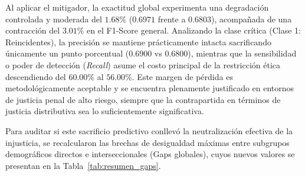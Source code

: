 \documentclass[11pt,a4paper]{article}
\begin{document}
\begin{table}[H]
\centering
\caption{Comparativa de rendimiento predictivo absoluto global y por clase crítica.}
\label{tab:rendimiento_predictivo}
\end{table}

Al aplicar el mitigador, la exactitud global experimenta una degradación controlada y moderada del $1.68\%$ ($0.6971$ frente a $0.6803$), acompañada de una contracción del $3.01\%$ en el F1-Score general. Analizando la clase crítica (Clase 1: Reincidentes), la precisión se mantiene prácticamente intacta sacrificando únicamente un punto porcentual ($0.6900$ vs $0.6800$), mientras que la sensibilidad o poder de detección (\textit{Recall}) asume el costo principal de la restricción ética descendiendo del $60.00\%$ al $56.00\%$. Este margen de pérdida es metodológicamente aceptable y se encuentra plenamente justificado en entornos de justicia penal de alto riesgo, siempre que la contrapartida en términos de justicia distributiva sea lo suficientemente significativa.

Para auditar si este sacrificio predictivo conllevó la neutralización efectiva de la injusticia, se recalcularon las brechas de desigualdad máximas entre subgrupos demográficos directos e interseccionales (Gaps globales), cuyos nuevos valores se presentan en la Tabla~\ref{tab:resumen_gaps}.
\end{document}
